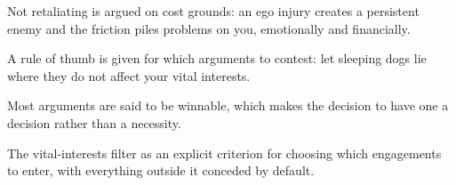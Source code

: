 

\begin{distilled}
  \item Not retaliating is argued on cost grounds: an ego injury creates a persistent enemy and the friction piles problems on you, emotionally and financially.
  \item A rule of thumb is given for which arguments to contest: let sleeping dogs lie where they do not affect your vital interests.
  \item Most arguments are said to be winnable, which makes the decision to have one a decision rather than a necessity.
\end{distilled}

\begin{unique}
  \item The vital-interests filter as an explicit criterion for choosing which engagements to enter, with everything outside it conceded by default.
\end{unique}

